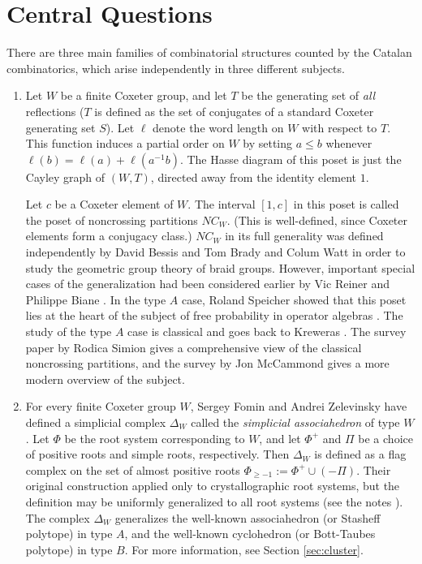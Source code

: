 \documentclass[12pt,letterpaper, reqno]{aimpl}
\begin{document}

\section{Central Questions}
\label{sec:central}

There are three main families of combinatorial structures counted by
the Catalan combinatorics, which arise independently in three different
subjects.

\begin{enumerate}
\item Let $W$ be a finite Coxeter group, and let $T$ be the generating
set of \emph{all} reflections ($T$ is defined as the set of conjugates of
a standard Coxeter generating set $S$). Let $\ell$ denote the word length
on $W$ with respect to $T$. This function induces a partial order on $W$
by setting $a\leq b$ whenever $\ell(b)=\ell(a)+\ell(a^{-1}b)$. The Hasse
diagram of this poset is just the Cayley graph of $(W,T)$, directed away
from the identity element $1$.

Let $c$ be a Coxeter element of $W$. The interval $[1,c]$ in
this poset is called the poset of noncrossing partitions
$NC_W$. (This is well-defined, since Coxeter elements form a conjugacy
class.) $NC_W$ in its full generality was defined independently
by David Bessis \cite{bessis:dual} and Tom Brady and Colum Watt
\cite{brady,brady-watt:kpi1} in order to study the geometric group theory
of braid groups. However, important special cases of the generalization
had been considered earlier by Vic Reiner \cite{reiner} and Philippe Biane
\cite{biane}. In the type $A$ case, Roland Speicher showed that this poset
lies at the heart of the subject of free probability in operator algebras
\cite{speicher:survey}. The study of the type $A$ case is classical and
goes back to Kreweras \cite{kreweras}. The survey paper \cite{simion}
by Rodica Simion gives a comprehensive view of the classical noncrossing
partitions, and the survey \cite{mccammond:noncrossing} by Jon McCammond
gives a more modern overview of the subject.

\item For every finite Coxeter group $W$, Sergey Fomin and Andrei
Zelevinsky have defined a simplicial complex $\Delta_W$ called the
\emph{simplicial associahedron} of type $W$. Let $\Phi$ be the root
system corresponding to $W$, and let $\Phi^+$ and $\Pi$ be a choice
of positive roots and simple roots, respectively. Then $\Delta_W$ is
defined as a flag complex on the set of  almost positive roots
$\Phi_{\geq -1}:= \Phi^+ \cup (-\Pi)$. Their original construction
\cite{fomin-zelevinsky:ysystems} applied only to crystallographic
root systems, but the definition may be uniformly generalized to all
root systems (see the notes \cite{fomin-reading:survey}). The complex
$\Delta_W$ generalizes the well-known associahedron (or Stasheff polytope)
in type $A$, and the well-known cyclohedron (or Bott-Taubes polytope)
in type $B$. For more information, see Section \ref{sec:cluster}.


\end{enumerate}
\end{document}
